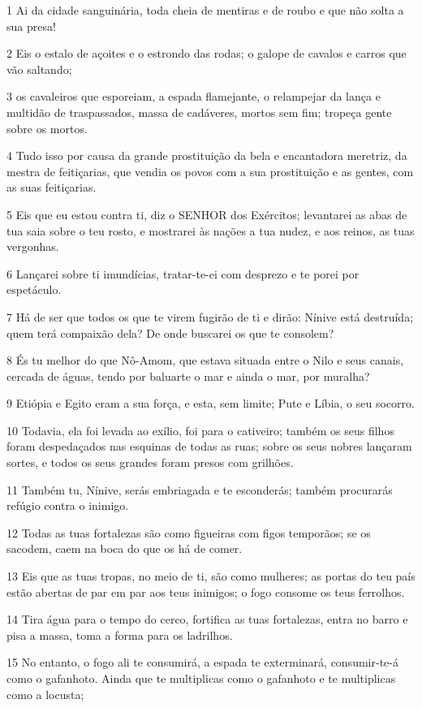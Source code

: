 \par 1 Ai da cidade sanguinária, toda cheia de mentiras e de roubo e que não solta a sua presa!
\par 2 Eis o estalo de açoites e o estrondo das rodas; o galope de cavalos e carros que vão saltando;
\par 3 os cavaleiros que esporeiam, a espada flamejante, o relampejar da lança e multidão de traspassados, massa de cadáveres, mortos sem fim; tropeça gente sobre os mortos.
\par 4 Tudo isso por causa da grande prostituição da bela e encantadora meretriz, da mestra de feitiçarias, que vendia os povos com a sua prostituição e as gentes, com as suas feitiçarias.
\par 5 Eis que eu estou contra ti, diz o SENHOR dos Exércitos; levantarei as abas de tua saia sobre o teu rosto, e mostrarei às nações a tua nudez, e aos reinos, as tuas vergonhas.
\par 6 Lançarei sobre ti imundícias, tratar-te-ei com desprezo e te porei por espetáculo.
\par 7 Há de ser que todos os que te virem fugirão de ti e dirão: Nínive está destruída; quem terá compaixão dela? De onde buscarei os que te consolem?
\par 8 És tu melhor do que Nô-Amom, que estava situada entre o Nilo e seus canais, cercada de águas, tendo por baluarte o mar e ainda o mar, por muralha?
\par 9 Etiópia e Egito eram a sua força, e esta, sem limite; Pute e Líbia, o seu socorro.
\par 10 Todavia, ela foi levada ao exílio, foi para o cativeiro; também os seus filhos foram despedaçados nas esquinas de todas as ruas; sobre os seus nobres lançaram sortes, e todos os seus grandes foram presos com grilhões.
\par 11 Também tu, Nínive, serás embriagada e te esconderás; também procurarás refúgio contra o inimigo.
\par 12 Todas as tuas fortalezas são como figueiras com figos temporãos; se os sacodem, caem na boca do que os há de comer.
\par 13 Eis que as tuas tropas, no meio de ti, são como mulheres; as portas do teu país estão abertas de par em par aos teus inimigos; o fogo consome os teus ferrolhos.
\par 14 Tira água para o tempo do cerco, fortifica as tuas fortalezas, entra no barro e pisa a massa, toma a forma para os ladrilhos.
\par 15 No entanto, o fogo ali te consumirá, a espada te exterminará, consumir-te-á como o gafanhoto. Ainda que te multiplicas como o gafanhoto e te multiplicas como a locusta;
